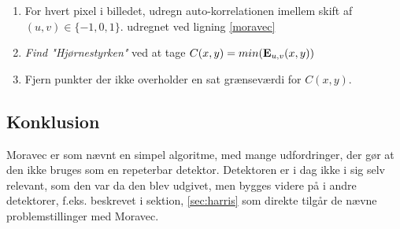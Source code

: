 \begin{enumerate}
\item{For hvert pixel i billedet, udregn auto-korrelationen imellem skift af $(u,v) \in \lbrace-1,0,1\rbrace$. udregnet ved ligning \ref{moravec}}
\item{\textit{Find "Hjørnestyrken"} ved at tage $C(x,y)=min(\bold{E}_{u,v}(x,y))$}
\item{Fjern punkter der ikke overholder en sat grænseværdi for $C(x,y)$.}
\end{enumerate}
\subsection*{Konklusion}
Moravec er som nævnt en simpel algoritme, med mange udfordringer, der gør at den ikke bruges som en repeterbar detektor. Detektoren er i dag ikke i sig selv relevant, som den var da den blev udgivet, men bygges videre på i andre detektorer, f.eks. \cite{Harris} beskrevet i sektion, \ref{sec:harris} som direkte tilgår de nævne problemstillinger med Moravec.